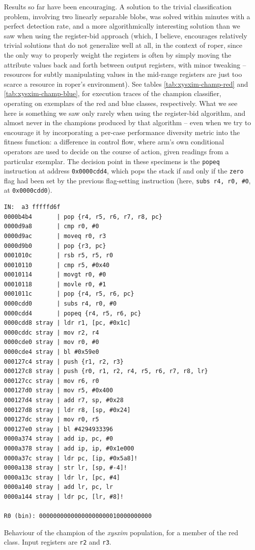 \documentclass[12pt,glossary]{dalthesis}
\begin{document}
Results so far have been encouraging. A solution to the trivial classification problem, involving
two linearly separable blobs, was solved within minutes with a perfect detection rate, and a
more algorithmically interesting solution than we saw when using the register-bid approach
(which, I believe, encourages relatively trivial solutions that do not generalize well at all, in
the context of \gls{roper}, since the only way to properly weight the registers is often by simply
moving the attribute values back and forth between output registers, with minor tweaking --
resources for subtly manipulating values in the mid-range registers are just too scarce a resource
in \gls{roper}'s environment). See tables \ref{tab:xysxim-champ-red} and \ref{tab:xysxim-champ-blue},
for execution traces of the champion classifier, operating on exemplars of the red and blue classes,
respectively. What we see here is something we saw only rarely when using the register-bid algorithm,
and almost never in the champions produced by that algorithm -- even when we try to encourage it
by incorporating a per-case performance diversity metric into the fitness
function: a difference in control flow, where \gls{arm}'s own conditional
operators are used to decide on the course of action, given readings from a
particular exemplar. The decision point in these specimens is the \texttt{popeq}
instruction at address \texttt{0x0000cdd4}, which pops the stack if and only if the
\texttt{zero} flag had been set by the previous flag-setting instruction (here, \texttt{subs
 r4, r0, \#0}, at \texttt{0x0000cdd0}).

\begin{table}
\begin{lstlisting}
IN:  a3 fffffd6f
0000b4b4       | pop {r4, r5, r6, r7, r8, pc}
0000d9a8       | cmp r0, #0
0000d9ac       | moveq r0, r3
0000d9b0       | pop {r3, pc}
0001010c       | rsb r5, r5, r0
00010110       | cmp r5, #0x40
00010114       | movgt r0, #0
00010118       | movle r0, #1
0001011c       | pop {r4, r5, r6, pc}
0000cdd0       | subs r4, r0, #0
0000cdd4       | popeq {r4, r5, r6, pc}
0000cdd8 stray | ldr r1, [pc, #0x1c]
0000cddc stray | mov r2, r4
0000cde0 stray | mov r0, #0
0000cde4 stray | bl #0x59e0
000127c4 stray | push {r1, r2, r3}
000127c8 stray | push {r0, r1, r2, r4, r5, r6, r7, r8, lr}
000127cc stray | mov r6, r0
000127d0 stray | mov r5, #0x400
000127d4 stray | add r7, sp, #0x28
000127d8 stray | ldr r8, [sp, #0x24]
000127dc stray | mov r0, r5
000127e0 stray | bl #4294933396
0000a374 stray | add ip, pc, #0
0000a378 stray | add ip, ip, #0x1e000
0000a37c stray | ldr pc, [ip, #0x5a8]!
0000a138 stray | str lr, [sp, #-4]!
0000a13c stray | ldr lr, [pc, #4]
0000a140 stray | add lr, pc, lr
0000a144 stray | ldr pc, [lr, #8]!

R0 (bin): 00000000000000000000010000000000
\end{lstlisting}
\caption{Behaviour of the champion of the \emph{xysxim} population, for a member of the red class. Input registers are \texttt{r2} and \texttt{r3}.}
\label{tab:xysxim-champ-red}
\end{table}
\end{document}
